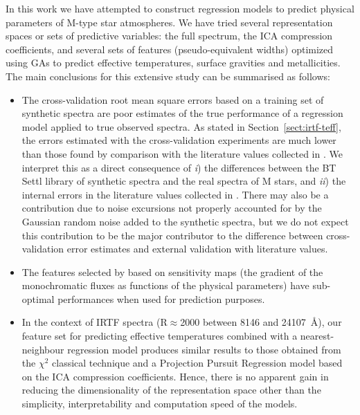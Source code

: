 %
In this work we have attempted to construct regression models to
predict physical parameters of M-type star atmospheres. We have tried
several representation spaces or sets of predictive variables: the
full spectrum, the ICA compression coefficients, and several sets of
features (pseudo-equivalent widths) optimized using GAs to predict
effective temperatures, surface gravities and metallicities. The main
conclusions for this extensive study can be summarised as follows:
\begin{itemize}

\item The cross-validation root mean square errors based on a training
  set of synthetic spectra are poor estimates of the true performance
  of a regression model applied to true observed spectra.  As stated
  in Section~\ref{sect:irtf-teff}, the errors estimated with the
  cross-validation experiments are much lower than those found by
  comparison with the literature values collected in
  \cite{cesetti}. We interpret this as a direct consequence of {\it
    i}) the differences between the BT Settl library of synthetic
  spectra and the real spectra of M stars, and {\it ii}) the internal
  errors in the literature values collected in \cite{cesetti}. There
  may also be a contribution due to noise excursions not properly
  accounted for by the Gaussian random noise added to the synthetic
  spectra, but we do not expect this contribution to be the major
  contributor to the difference between cross-validation error
  estimates and external validation with literature values.

\item The features selected by \cite{cesetti} based on sensitivity 
      maps (the gradient of the monochromatic fluxes as functions of the 
      physical parameters) have sub-optimal performances when used 
      for prediction purposes.

\item In the context of IRTF spectra (R$\approx$2000 between 8146 and
  24107\ \AA), our feature set for predicting effective temperatures
  combined with a nearest-neighbour regression model produces similar
  results to those obtained from the $\chi^2$ classical technique and
  a Projection Pursuit Regression model based on the ICA compression
  coefficients. Hence, there is no apparent gain in reducing the
  dimensionality of the representation space other than the
  simplicity, interpretability and computation speed of the models.


\end{itemize}

